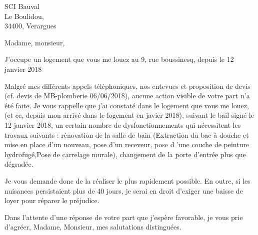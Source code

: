 \documentclass[11pt]{lettre}
\begin{document}
	\begin{letter}{SCI Bauval\\ Le Boulidou,\\ 34400, Verargues}
		\signature{Cédric \textsc{Jourdain}}
		\address{9, rue boussinesq}
		\opening{Madame, monsieur,}
		
	
		J’occupe un logement que vous me louez au 9, rue boussinesq, depuis le 12 janvier 2018

		Malgré mes différents appels téléphoniques, nos entevues et proposition de devis (cf. devis de MB-plomberie 06/06/2018), aucune action visible de votre part n'a été faite. Je vous rappelle que j'ai constaté dans le logement que vous me louez, (et ce, depuis mon arrivé dans le logement en javier 2018), suivant le bail signé le 12 janvier 2018, un certain nombre de dysfonctionnements qui nécessitent les travaux suivants : rénovation de la salle de bain (Extraction du bac à douche et mise en place d'un nouveau, pose d'un receveur, pose d 'une couche de peinture hydrofugé,Pose de carrelage murale), changement de la porte d'entrée plus que dégradée.

		Je vous demande donc de la réaliser le plus rapidement possible. En outre, si les nuisances persistaient plus de 40 jours, je serai en droit d’exiger une baisse de loyer pour réparer le préjudice.
 
		\closing{Dans l’attente d’une réponse de votre part que j’espère favorable, je vous prie d'agréer, Madame, Monsieur, mes salutations distinguées. }
 
	\end{letter}
\end{document}
